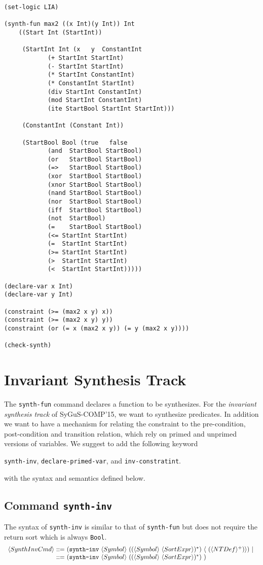 \documentclass{llncs}
\begin{document}
\begin{verbatim}
(set-logic LIA)

(synth-fun max2 ((x Int)(y Int)) Int
    ((Start Int (StartInt))
               
     (StartInt Int (x   y  ConstantInt 
            (+ StartInt StartInt)
            (- StartInt StartInt)
            (* StartInt ConstantInt)
            (* ConstantInt StartInt)
            (div StartInt ConstantInt)
            (mod StartInt ConstantInt)
            (ite StartBool StartInt StartInt)))
        
	 (ConstantInt (Constant Int))
	      
     (StartBool Bool (true   false
            (and  StartBool StartBool)
            (or   StartBool StartBool)
            (=>   StartBool StartBool)
            (xor  StartBool StartBool)
            (xnor StartBool StartBool)
            (nand StartBool StartBool)
            (nor  StartBool StartBool)
            (iff  StartBool StartBool)
            (not  StartBool)
            (=    StartBool StartBool)
            (<= StartInt StartInt)
            (=  StartInt StartInt)
            (>= StartInt StartInt)
            (>  StartInt StartInt)
            (<  StartInt StartInt)))))

(declare-var x Int)
(declare-var y Int)

(constraint (>= (max2 x y) x))
(constraint (>= (max2 x y) y))
(constraint (or (= x (max2 x y)) (= y (max2 x y))))

(check-synth)
\end{verbatim}

\section{Invariant Synthesis Track}
The \texttt{synth-fun} command declares a function to be synthesizes. For the \emph{invariant synthesis track} of SyGuS-COMP'15, we want to synthesize predicates. In addition we want to have a mechanism for relating the constraint to the pre-condition, post-condition and transition relation, which rely on primed and unprimed versions of variables. We suggest  to add the following keyword 
\begin{center}
\texttt{synth-inv}, \texttt{declare-primed-var}, and \texttt{inv-constratint}.
\end{center} 
with the syntax and semantics defined below.

\subsection*{Command \texttt{synth-inv}}
The syntax of \texttt{synth-inv} is similar to that of \texttt{synth-fun} but does not require the return sort which is always \texttt{Bool}. 
$$\begin{array}{r@{~::=~}l}
\la SynthInvCmd\ra & (\texttt{synth-inv} ~\la Symbol \ra ~(( \la Symbol \ra  ~\la SortExpr\ra)^*) ~\la ~(
\la NTDef\ra^+) \ra)~|~ \\
& (\texttt{synth-inv} ~\la Symbol \ra ~(( \la Symbol \ra  ~\la SortExpr\ra)^*)\ )\\
\end{array}$$
\end{document}

